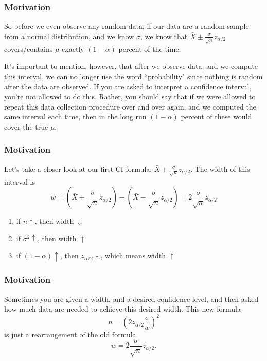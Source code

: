 \documentclass{beamer}
\begin{document}
\begin{frame}
\frametitle{Motivation}

So before we even observe any random data, if our data are a random sample from a normal distribution, and we know $\sigma$, we know that $\bar{X} \pm \frac{\sigma}{\sqrt{n}} z_{\alpha/2}$ covers/contains $\mu$ exactly $(1-\alpha)$ percent of the time.
\newline

It's important to mention, however, that after we observe data, and we compute this interval, we can no longer use the word ``probability" since nothing is random after the data are observed. If you are asked to interpret a confidence interval, you're not allowed to do this. Rather, you should say that if we were allowed to repeat this data collection procedure over and over again, and we computed the same interval each time, then in the long run $(1-\alpha)$ percent of these would cover the true $\mu$.
\end{frame}


\begin{frame}
\frametitle{Motivation}

Let's take a closer look at our first CI formula: $\bar{X} \pm \frac{\sigma}{\sqrt{n}} z_{\alpha/2}$. The width of this interval is  
\[
w = (\bar{X} +\frac{\sigma}{\sqrt{n}} z_{\alpha/2}) -  (\bar{X} - \frac{\sigma}{\sqrt{n}} z_{\alpha/2}) = 2 \frac{\sigma}{\sqrt{n}} z_{\alpha/2}
\]

\begin{enumerate}
\item if $n \uparrow$,  then width $\downarrow$
\item if $\sigma^2 \uparrow$,  then width $\uparrow$
\item if $(1-\alpha) \uparrow$, then $z_{\alpha/2} \uparrow$, which means width $\uparrow$
\end{enumerate}
\end{frame}


\begin{frame}
\frametitle{Motivation}

Sometimes you are given a width, and a desired confidence level, and then asked how much data are needed to achieve this desired width. This new formula
\[
n = \left( 2 z_{\alpha/2} \frac{\sigma}{w} \right)^2
\]
 is just a rearrangement of the old formula 
 \[
 w = 2 \frac{\sigma}{\sqrt{n}} z_{\alpha/2}.
 \]
\end{frame}
\end{document}
